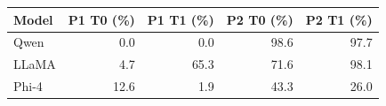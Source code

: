 \begin{tabular}{@{}lrrrr@{}}
\toprule
Model & P1 T0 (\%) & P1 T1 (\%) & P2 T0 (\%) & P2 T1 (\%) \\
\midrule
Qwen & 0.0 & 0.0 & 98.6 & 97.7 \\
LLaMA & 4.7 & 65.3 & 71.6 & 98.1 \\
Phi-4 & 12.6 & 1.9 & 43.3 & 26.0 \\
\bottomrule
\end{tabular}